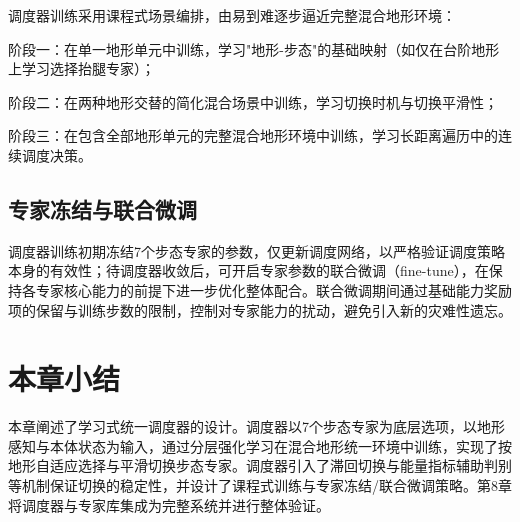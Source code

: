 调度器训练采用课程式场景编排，由易到难逐步逼近完整混合地形环境：

阶段一：在单一地形单元中训练，学习"地形-步态"的基础映射（如仅在台阶地形上学习选择抬腿专家）；

阶段二：在两种地形交替的简化混合场景中训练，学习切换时机与切换平滑性；

阶段三：在包含全部地形单元的完整混合地形环境中训练，学习长距离遍历中的连续调度决策。

\subsection{专家冻结与联合微调}

调度器训练初期冻结7个步态专家的参数，仅更新调度网络，以严格验证调度策略本身的有效性；待调度器收敛后，可开启专家参数的联合微调（fine-tune），在保持各专家核心能力的前提下进一步优化整体配合。联合微调期间通过基础能力奖励项的保留与训练步数的限制，控制对专家能力的扰动，避免引入新的灾难性遗忘。

\section{本章小结}

本章阐述了学习式统一调度器的设计。调度器以7个步态专家为底层选项，以地形感知与本体状态为输入，通过分层强化学习在混合地形统一环境中训练，实现了按地形自适应选择与平滑切换步态专家。调度器引入了滞回切换与能量指标辅助判别等机制保证切换的稳定性，并设计了课程式训练与专家冻结/联合微调策略。第8章将调度器与专家库集成为完整系统并进行整体验证。
